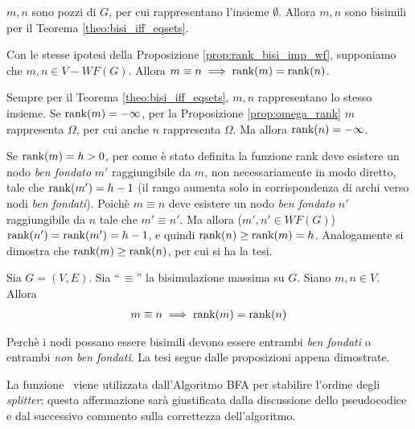 \begin{proof2}
    $m,n$ sono pozzi di $G$, per cui rappresentano l'insieme $\emptyset$. Allora $m,n$ sono bisimili per il Teorema \ref{theo:bisi_iff_eqsets}.
\end{proof2}
\begin{proposition}
    Con le stesse ipotesi della Proposizione \ref{prop:rank_bisi_imp_wf}, supponiamo che $m,n \in V - WF(G)$. Allora $m \equiv n \implies \textup{rank}(m) = \textup{rank}(n)$.
\end{proposition}
\begin{proof2}
    Sempre per il Teorema \ref{theo:bisi_iff_eqsets}, $m,n$ rappresentano lo stesso insieme. Se $\textup{rank}(m) = -\infty$, per la Proposizione \ref{prop:omega_rank} $m$ rappresenta $\Omega$, per cui anche $n$ rappresenta $\Omega$. Ma allora $\textup{rank}(n) = -\infty$.

    Se $\textup{rank}(m) = h > 0$, per come è stato definita la funzione rank deve esistere un nodo \emph{ben fondato} $m'$ raggiungibile da $m$, non necessariamente in modo diretto, tale che $\textup{rank}(m') = h-1$ (il rango aumenta solo in corrispondenza di archi verso nodi \emph{ben fondati}). Poichè $m \equiv n$ deve esistere un nodo \emph{ben fondato} $n'$ raggiungibile da $n$ tale che $m' \equiv n'$. Ma allora ($m',n' \in WF(G)$) $\textup{rank}(n') = \textup{rank}(m') = h-1$, e quindi $\textup{rank}(n) \geq \textup{rank}(m) = h$. Analogamente si dimostra che $\textup{rank}(m) \geq \textup{rank}(n)$, per cui si ha la tesi.
\end{proof2}
\begin{theorem}
    \label{theo:bisi_rank}
    Sia $G = (V,E)$. Sia ``\,$\equiv$'' la bisimulazione massima su $G$. Siano $m,n \in V$. Allora
    \begin{gather*}
        m \equiv n \implies \textup{rank}(m) = \textup{rank}(n)
    \end{gather*}
\end{theorem}
\begin{proof2}
    Perchè i nodi possano essere bisimili devono essere entrambi \emph{ben fondati} o entrambi \emph{non ben fondati}. La tesi segue dalle proposizioni appena dimostrate.
\end{proof2}
La funzione \rankfunc \, viene utilizzata dall'Algoritmo BFA per stabilire l'ordine degli \emph{splitter}; questa affermazione sarà giustificata dalla discussione dello pseudocodice e dal successivo commento sulla correttezza dell'algoritmo.

